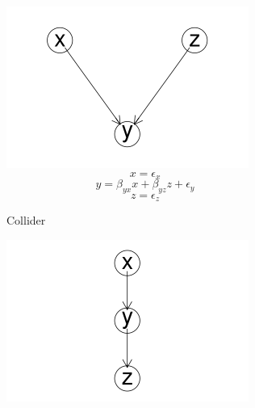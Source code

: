 \documentclass{article}
\begin{document}
\begin{figure}
  \centering
  \begin{subfigure}{0.3\textwidth}
    \centering
    \includegraphics[width=\linewidth]{images/collider.png} 
    \small
    \begin{equation*}
      x = \epsilon_{x}
    \end{equation*}
    \begin{equation*}
      y = \beta_{yx} x + \beta_{yz} z + \epsilon_{y}
    \end{equation*}
    \begin{equation*}
      z = \epsilon_{z}
    \end{equation*}
    \caption{Collider}
    \label{collider}
  \end{subfigure}
  \begin{subfigure}{0.3\textwidth}
    \includegraphics[width=\linewidth]{images/chain.png}

\end{subfigure}
\end{figure}
\end{document}
